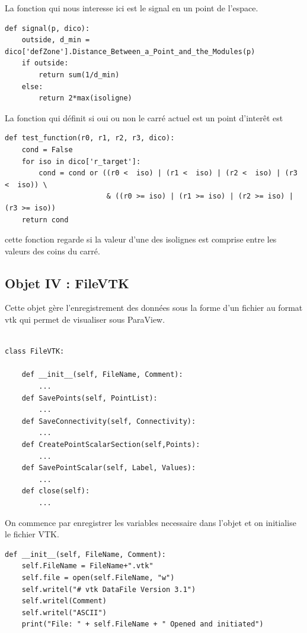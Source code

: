 \documentclass[french]{article}
\begin{document}
La fonction qui nous interesse ici est le signal en un point de l'espace. 

\begin{verbatim}
def signal(p, dico):
    outside, d_min = dico['defZone'].Distance_Between_a_Point_and_the_Modules(p)
	if outside:
		return sum(1/d_min)
	else:
		return 2*max(isoligne)
\end{verbatim}

\newpage

La fonction qui définit si oui ou non le carré actuel est un point d'interêt est 

\begin{verbatim}
def test_function(r0, r1, r2, r3, dico):
    cond = False
    for iso in dico['r_target']:
        cond = cond or ((r0 <  iso) | (r1 <  iso) | (r2 <  iso) | (r3 <  iso)) \
                        & ((r0 >= iso) | (r1 >= iso) | (r2 >= iso) | (r3 >= iso))
    return cond
\end{verbatim}
cette fonction regarde si la valeur d'une des isolignes est comprise entre les valeurs des coins du carré.

\subsection{Objet IV : FileVTK}

Cette objet gère l'enregistrement des données sous la forme d'un fichier au format vtk
qui permet de visualiser sous ParaView.

\begin{verbatim}

class FileVTK:

    def __init__(self, FileName, Comment):
		...
    def SavePoints(self, PointList):
        ...
    def SaveConnectivity(self, Connectivity):
		...
	def CreatePointScalarSection(self,Points):
		...        
    def SavePointScalar(self, Label, Values):
		...    
    def close(self):
        ...

\end{verbatim}

On commence par enregistrer les variables necessaire dans l'objet et on initialise le fichier VTK.

\begin{verbatim}
def __init__(self, FileName, Comment):
	self.FileName = FileName+".vtk"
	self.file = open(self.FileName, "w")
	self.writel("# vtk DataFile Version 3.1")
	self.writel(Comment)
	self.writel("ASCII")
	print("File: " + self.FileName + " Opened and initiated")
\end{verbatim}
\end{document}
